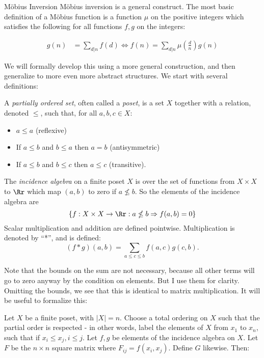 \documentclass[12pt]{pom_thesis}
\begin{document}
\begin{chapter}{M\"obius Inversion}
M\"obius inversion is a general construct. The most basic definition of a M\"obius function is a function $\mu$ on the positive integers which satisfies the following for all functions $f,g$ on the integers:

\begin{align*}
g(n) &= \sum_{d | n} f(d) \iff f(n) = \sum_{d | n} \mu\left(\frac dn\right) g(n)
\end{align*}

We will formally develop this using a more general construction, and then generalize to more even more abstract structures. We start with several definitions:
\begin{defn}
A \emph{partially ordered set}, often called a \emph{poset}, is a set $X$ together with a relation, denoted $\leq$, such that, for all $a,b,c \in X$:
\begin{itemize}
\item $a \leq a$ (reflexive)
\item If $a \leq b$ and $b \leq a$ then $a = b$ (antisymmetric)
\item If $a \leq b$ and $b \leq c$ then $a \leq c$ (transitive).
\end{itemize}
\end{defn}
\begin{defn}
The \emph{incidence algebra} on a finite poset $X$ is over the set of functions from $X \times X$ to $\Rr$ which map $(a,b)$ to zero if $a \nleq b$. So the elements of the incidence algebra are 
\[\{f:X \times X \rightarrow \Rr:a \nleq b \Rightarrow f(a,b) = 0\}
\]
Scalar multiplication and addition are defined pointwise.  Multiplication is denoted by ``*'', and is defined:
\[(f* g)(a,b) = \sum_{a \leq c \leq b}f(a,c)g(c,b).\]
\end{defn}
Note that the bounds on the sum are not necessary, because all other terms will go to zero anyway by the condition on elements. But I use them for clarity. Omitting the bounds, we see that this is identical to matrix multiplication. It will be useful to formalize this:
\begin{lemma}\label{mat_eq}
Let $X$ be a finite poset, with $|X|=n$. Choose a total ordering on $X$ such that the partial order is respected - in other words, label the elements of $X$ from $x_1$ to $x_n$, such that if $x_i \leq x_j, i \leq j$. Let $f,g$ be elements of the incidence algebra on $X$. Let $F$ be the $n\times n$ square matrix where $F_{ij}=f(x_i, x_j)$. Define $G$ likewise. Then:
\begin{enumerate}[a)]

\end{enumerate}
\end{lemma}
\end{chapter}
\end{document}
